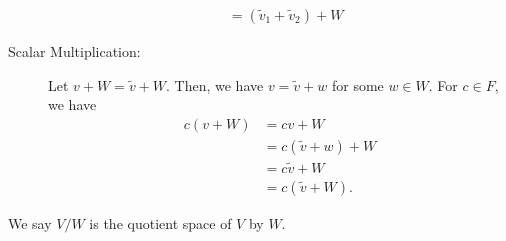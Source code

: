 \documentclass[10pt]{mypackage}
\begin{document}
\begin{definition}
\begin{description}
\begin{align*}
                                                    &= \left(\tilde{v}_1 + \tilde{v}_2\right) + W
      \end{align*}
    \item[Scalar Multiplication:] Let $v + W = \tilde{v} + W$. Then, we have $v = \tilde{v} + w$ for some $w\in W$. For $c\in F$, we have
      \begin{align*}
        c\left(v + W\right) &= cv + W\\
                            &= c\left(\tilde{v} + w\right) + W\\
                            &= c\tilde{v} + W\\
                            &= c\left(\tilde{v} + W\right).
      \end{align*}
  \end{description}
  We say $V/W$ is the quotient space of $V$ by $W$.
\end{definition}
\end{document}
